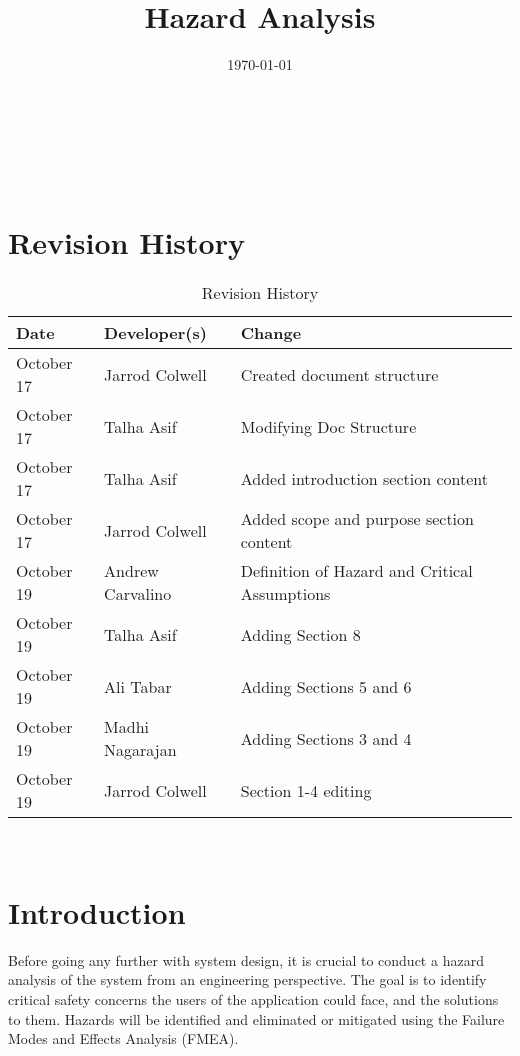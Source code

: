 \documentclass[12pt]{article}
\title{Hazard Analysis\\\progname}
\author{\authname}
\date{\today}
\begin{document}
\maketitle

~\newpage {}

\tableofcontents

~\newpage

\section*{Revision History}
\begin{table}[hp]
	\caption{Revision History} \label{TblRevisionHistory}
	\begin{tabularx}{\textwidth}{llX}
		\toprule
		\textbf{Date} & \textbf{Developer(s)} & \textbf{Change}\\
		\midrule
		October 17 & Jarrod Colwell & Created document structure\\
		October 17 & Talha Asif & Modifying Doc Structure\\
		October 17 & Talha Asif & Added introduction section content\\
		October 17 & Jarrod Colwell & Added scope and purpose section content\\
		October 19 & Andrew Carvalino & Definition of Hazard and Critical Assumptions\\
		October 19 & Talha Asif & Adding Section 8\\
		October 19 & Ali Tabar & Adding Sections 5 and 6\\
    	October 19 & Madhi Nagarajan & Adding Sections 3 and 4\\
		October 19 & Jarrod Colwell & Section 1-4 editing\\
		\bottomrule
		\end{tabularx}
\end{table}

~\newpage {}

\section{Introduction}
Before going any further with system design, it is crucial to conduct a hazard analysis of the system from an engineering perspective. The goal is to identify critical safety concerns the users of the application could face, and the solutions to them. Hazards will be identified and eliminated or mitigated using the Failure Modes and Effects Analysis (FMEA).
\end{document}
